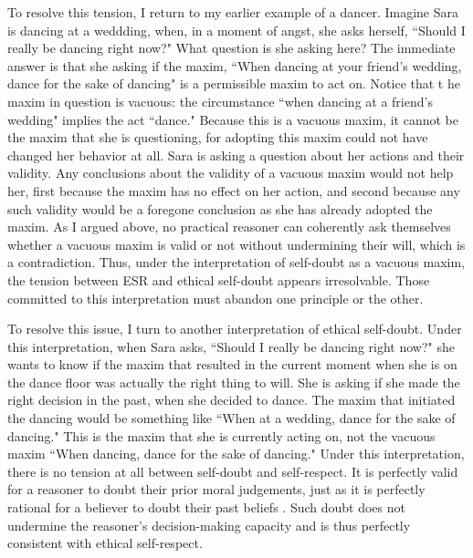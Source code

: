 \begin{isabellebody}
\begin{isamarkuptext}
To resolve this tension, I return to my earlier example of a dancer. Imagine Sara is dancing at a 
weddding, when, in a moment of angst, she asks herself, ``Should I really be dancing right now?" 
What question is she asking here? The immediate answer is that she asking if the maxim, ``When dancing 
at your friend's wedding, dance for the sake of dancing" is a permissible maxim to act on. Notice that t
he maxim in question is vacuous: the circumstance ``when dancing at a friend's wedding" implies the act 
``dance." Because this is a vacuous maxim, it cannot be the maxim that she is questioning, for adopting 
this maxim could not have changed her behavior at all. Sara is asking a question about her actions and 
their validity. Any conclusions about the validity of a vacuous maxim would not help her, first because 
the maxim has no effect on her action, and second because any such validity would be a foregone conclusion
as she has already adopted the maxim. As 
I argued above, no practical reasoner can coherently ask themselves whether a vacuous maxim is 
valid or not without undermining their will, which is a contradiction. Thus, under 
the interpretation of self-doubt as a vacuous maxim, the tension between ESR and ethical self-doubt 
appears irresolvable. Those committed to this interpretation must abandon one principle or the other.

To resolve this issue, I turn to another interpretation of ethical self-doubt. Under this interpretation, 
when Sara asks, ``Should I really be dancing right now?" she wants to know if the maxim that 
resulted in the current moment when she is on the dance floor was actually 
the right thing to will. She is asking if she made the right 
decision in the past, when she decided to dance. The maxim that initiated the dancing would be something 
like ``When at a wedding, dance for the sake of dancing." This is the maxim that she is currently acting 
on, not the vacuous maxim ``When dancing, dance for the sake of dancing." Under this interpretation, 
there is no tension at all between self-doubt and self-respect. It is perfectly valid for a reasoner 
to doubt their prior moral judgements, just as it is perfectly rational for a believer to doubt their 
past beliefs \cite[3-4]{christensen}. Such doubt does not undermine the reasoner's decision-making 
capacity and is thus perfectly consistent with ethical self-respect. 


\end{isamarkuptext}
\end{isabellebody}

